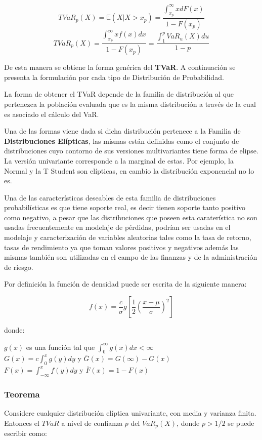 \documentclass[]{article}
\begin{document}
\[TVaR_p(X)=\mathbb{E}(X|X>x_p)=\frac{\int_{x_p}^{\infty}xdF(x)}{1-F(x_p)}\]
\[TVaR_p(X)=\frac{\int_{x_p}^{\infty}xf(x)dx}{1-F(x_p)}=\frac{\int_{1}^{p}VaR_u(X)du}{1-p}\]

De esta manera se obtiene la forma genérica del \textbf{TVaR}. A
continuación se presenta la formulación por cada tipo de Distribución de
Probabilidad.

La forma de obtener el TVaR depende de la familia de distribución al que
pertenezca la población evaluada que es la misma distribución a través
de la cual es asociado el cálculo del VaR.

Una de las formas viene dada si dicha distribución pertenece a la
Familia de \textbf{Distribuciones Elípticas}, las mismas están definidas
como el conjunto de distribuciones cuyo contorno de sus versiones
multivariantes tiene forma de elipse. La versión univariante corresponde
a la marginal de estas. Por ejemplo, la Normal y la T Student son
elípticas, en cambio la distribución exponencial no lo es.

Una de las características deseables de esta familia de distribuciones
probabilísticas es que tiene soporte real, es decir tienen soporte tanto
positivo como negativo, a pesar que las distribuciones que poseen esta
caraterística no son usadas frecuentemente en modelaje de pérdidas,
podrían ser usadas en el modelaje y caracterización de variables
aleatorias tales como la tasa de retorno, tasas de rendimiento ya que
toman valores positivos y negativos además las mismas también son
utilizadas en el campo de las finanzas y de la administración de riesgo.

Por definición la función de densidad puede ser escrita de la siguiente
manera:

\[f(x)=\frac{c}{\sigma}g\left[\frac{1}{2}\left(\frac{x-\mu}{\sigma}\right)^2\right]\]

donde:

\(g(x)\) es una función tal que \(\int_{0}^{\infty}g(x)dx < \infty\)\\
\(G(x)=c\int_{0}^{x}g(y)dy\) y \(\bar{G}(x)=G(\infty)-G(x)\)\\
\(F(x)=\int_{-\infty}^{x}f(y)dy\) y \(\bar{F}(x)=1-F(x)\)

\hypertarget{teorema}{%
\subsubsection{Teorema}\label{teorema}}

Considere cualquier distribución elíptica univariante, con media y
varianza finita. Entonces el \(TVaR\) a nivel de confianza \(p\) del
\(VaR_p(X)\), donde \(p > 1/2\) se puede escribir como:
\end{document}
